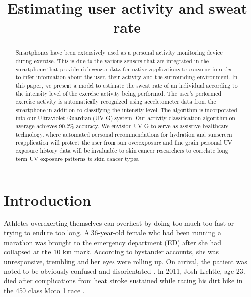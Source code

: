 \documentclass[conference]{IEEEtran}
\begin{document}
\title{Estimating user activity and sweat rate}
\author
{
}
\maketitle



\begin{abstract}
Smartphones have been extensively used as a personal activity monitoring device during exercise. This is due to the various sensors that are integrated in the smartphone that provide rich sensor data for native applications to consume in order to infer information about the user, their activity and the surrounding environment. In this paper, we present a model to estimate the sweat rate of an individual according to the intensity level of the exercise activity being performed. The user's performed exercise activity is automatically recognized using accelerometer data from the smartphone in addition to classifying the intensity level. The algorithm is incorporated into our Ultraviolet Guardian (UV-G) system. Our activity classification algorithm on average achieves 90.2\% accuracy. We envision UV-G to serve as assistive healthcare technology, where automated personal recommendations for hydration and sunscreen reapplication will protect the user from sun overexposure and fine grain personal UV exposure history data will be invaluable to skin cancer researchers to correlate long term UV exposure patterns to skin cancer types.
\end{abstract}

\section{Introduction}
Athletes overexerting themselves can overheat by doing too much too fast or trying to endure too long. A 36-year-old female who had been running a marathon was brought to the emergency department (ED) after she had collapsed at the 10 km mark. According to bystander accounts, she was unresponsive, trembling and her eyes were rolling up. On arrival, the patient was noted to be obviously confused and disorientated  \cite{ref1}. In 2011, Josh Lichtle, age 23, died after complications from heat stroke sustained while racing his dirt bike in the 450 class Moto 1 race  \cite{ref2}.
\end{document}
